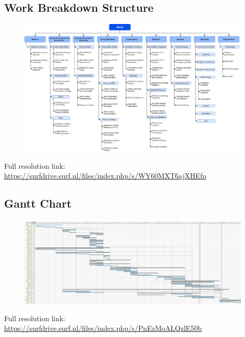 \documentclass[12pt, english, NoHyper]{AE4010-template}
\begin{document}
\appendix


\newpage
\begin{landscape}
 \section{Work Breakdown Structure}
 \label{sec:WBS}


\begin{figure}[h!]
 \includegraphics[width=1.0\textwidth]{figures/wbs.png}
\end{figure}
Full resolution link: \url{https://surfdrive.surf.nl/files/index.php/s/WY60MXT6ajXHEfp}
\end{landscape}
\newpage
\begin{landscape}
 \section{Gantt Chart}
 \label{sec:Gantt}


\begin{figure}[h!]
 \includegraphics[width=1.0\textwidth]{figures/thesis_rm.png}
\end{figure}
Full resolution link: \url{https://surfdrive.surf.nl/files/index.php/s/PnEzMoALQzlE50b}
\end{landscape}
\end{document}
